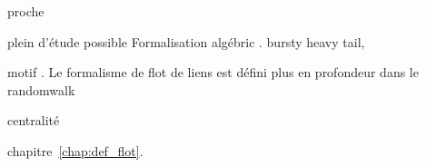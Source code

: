 proche\cite{Matias2015}

\cite{Holme2013a,Holme2015b,Holme2015} plein d'étude possible
Formalisation algébric \cite{Batagelj2015}.
bursty \cite{Karsai2012a,Karsai2011,Moinet2015,Stehle2010} \cite{Malmgren2008,Malmgren2009} heavy tail, \cite{Rocha2013}

motif \cite{Kovanen2011a,Kovanen2013}.
Le formalisme de flot de liens est défini plus en profondeur dans le 
randomwalk\cite{Starnini2012b}

\cite{Gaumont2016}
centralité \cite{Costa2015,Kim2012, Pfitzner2013a, Praprotnik2015,Scholtes2015,Takaguchi2016}


chapitre~\ref{chap:def_flot}.


